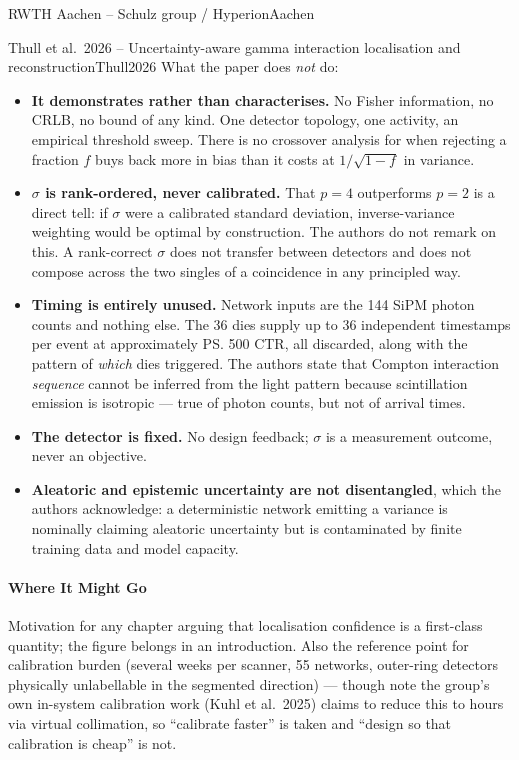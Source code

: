 \begin{programnote}{RWTH Aachen -- Schulz group / Hyperion}{Aachen}
\begin{papernote}{Thull et al.\ 2026 -- Uncertainty-aware gamma interaction localisation and reconstruction}{Thull2026}
What the paper does \emph{not} do:
\begin{itemize}
    \item \textbf{It demonstrates rather than characterises.} No Fisher information, no
        CRLB, no bound of any kind. One detector topology, one activity, an empirical
        threshold sweep. There is no crossover analysis for when rejecting a fraction $f$
        buys back more in bias than it costs at $1/\sqrt{1-f}$ in variance.
    \item \textbf{$\sigma$ is rank-ordered, never calibrated.} That $p = 4$ outperforms
        $p = 2$ is a direct tell: if $\sigma$ were a calibrated standard deviation,
        inverse-variance weighting would be optimal by construction. The authors do not
        remark on this. A rank-correct $\sigma$ does not transfer between detectors and
        does not compose across the two singles of a coincidence in any principled way.
    \item \textbf{Timing is entirely unused.} Network inputs are the 144 SiPM photon counts
        and nothing else. The 36 dies supply up to 36 independent timestamps per event at
        approximately \ps{500} CTR, all discarded, along with the pattern of \emph{which}
        dies triggered. The authors state that Compton interaction \emph{sequence} cannot
        be inferred from the light pattern because scintillation emission is isotropic ---
        true of photon counts, but not of arrival times.
    \item \textbf{The detector is fixed.} No design feedback; $\sigma$ is a measurement
        outcome, never an objective.
    \item \textbf{Aleatoric and epistemic uncertainty are not disentangled}, which the
        authors acknowledge: a deterministic network emitting a variance is nominally
        claiming aleatoric uncertainty but is contaminated by finite training data and
        model capacity.
\end{itemize}

\paragraph{Where It Might Go}
Motivation for any chapter arguing that localisation confidence is a first-class quantity;
the  figure belongs in an introduction. Also the reference point for calibration
burden (several weeks per scanner, 55 networks, outer-ring detectors physically
unlabellable in the segmented direction) --- though note the group's own in-system
calibration work (Kuhl et al.\ 2025) claims to reduce this to hours via virtual
collimation, so ``calibrate faster'' is taken and ``design so that calibration is cheap''
is not.


\end{papernote}
\end{programnote}
